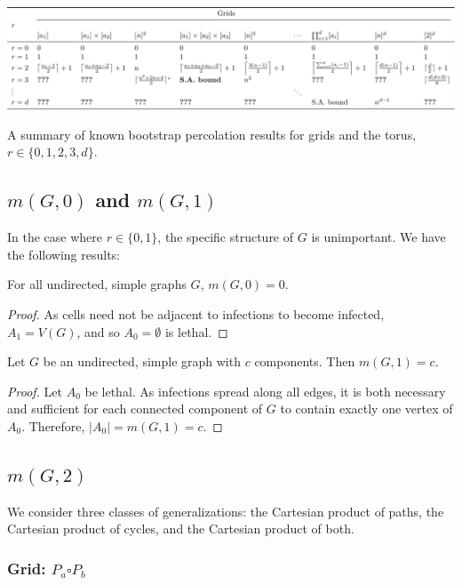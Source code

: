 \begin{table}[]
\centering
\includegraphics[width=\textwidth,origin=c]{tables/1/known_bounds.pdf}
\caption{A summary of known bootstrap percolation results for grids and the torus, $r \in \{0,1,2,3,d\}$.}
\label{tab:known_bounds}
\end{table} 

\subsection{$m(G,0)$ and $m(G,1)$} 

In the case where $r \in \{0,1\}$, the specific structure of $G$ is unimportant. We have the following results:

\begin{thm}
For all undirected, simple graphs $G$, $m(G,0) = 0$.
\end{thm}

\begin{proof}
As cells need not be adjacent to infections to become infected, $A_1 = V(G)$, and so $A_0 = \emptyset$ is lethal.
\end{proof}

\begin{thm}
Let $G$ be an undirected, simple graph with $c$ components. Then $m(G, 1) = c$.
\end{thm}

\begin{proof}
Let $A_0$ be lethal. As infections spread along all edges, it is both necessary and sufficient for each connected component of $G$ to contain exactly one vertex of $A_0$. Therefore, $|A_0| = m(G,1) = c$.
\end{proof}

\subsection{$m(G,2)$} 

We consider three classes of generalizations: the Cartesian product of paths, the Cartesian product of cycles, and the Cartesian product of both. 

\subsubsection{Grid: $P_a \square P_b$}

